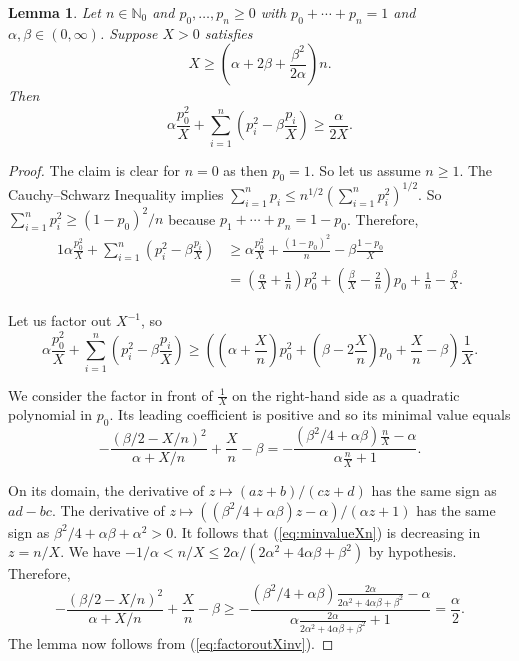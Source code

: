 \documentclass[12pt,oneside,a4]{amsart}
\newcommand{\IN}{\mathbb{N}}
\newcounter{maincounter}
\numberwithin{maincounter}{section}
\numberwithin{equation}{section}
\newtheorem{lemma}[maincounter]{Lemma}
\begin{document}
\begin{lemma}
  \label{lem:qflowerbound}
  Let $n\in\IN_0$ and $p_0,\ldots,p_n\ge 0$ with $p_0+\cdots+p_n=1$ and
  $\alpha,\beta\in (0,\infty)$. Suppose $X>0$ satisfies
  \begin{equation*}    
    X \ge \left(\alpha+2\beta+\frac{\beta^2}{2\alpha}\right)n. 
  \end{equation*}
  Then
  \begin{equation*}
    \alpha\frac{p_0^2}{X} +\sum_{i=1}^n\left(p_i^2 - \beta\frac{p_i}{X}\right)
    \ge
    \frac{\alpha}{2X}.
  \end{equation*} 
\end{lemma}
\begin{proof}
  The claim is clear for $n=0$ as then $p_0=1$. So let us assume $n\ge 1$.
  The Cauchy--Schwarz Inequality implies
  $\sum_{i=1}^n p_i \le n^{1/2} (\sum_{i=1}^n p_i^2)^{1/2}$. So
  $\sum_{i=1}^n p_i^2 \ge (1-p_0)^2/n$ because $p_1+\cdots+p_n=1-p_0$.
  Therefore,
  \begin{alignat*}1
    \alpha\frac{p_0^2}{X}  +\sum_{i=1}^n\left(p_i^2 -\beta\frac{p_i}{X}\right) &\ge 
    \alpha\frac{p_0^2}{X}  +\frac{(1-p_0)^2}{n} - \beta\frac{1-p_0}{X}\\
    &= \left(\frac{\alpha}{X} +\frac 1n\right)p_0^2 +
    \left(\frac{\beta}{X}-\frac{2}{n}\right)p_0 +\frac{1}{n} - \frac{\beta}{X}.
  \end{alignat*}

  Let us factor out $X^{-1}$, so
  \begin{equation}
    \label{eq:factoroutXinv}
    \alpha\frac{p_0^2}{X}  +\sum_{i=1}^n\left(p_i^2 -\beta\frac{p_i}{X}\right)
    \ge
    \left(\left(\alpha+\frac{X}{n}\right)p_0^2 +
      \left(\beta-2\frac{X}{n}\right)p_0 + \frac{X}{n} - \beta\right)\frac{1}{X} .
  \end{equation}

  We consider the factor in front of $\frac 1X$
  on the right-hand side
  as a quadratic polynomial in $p_0$.
  Its leading coefficient is positive and so its minimal value equals
  \begin{equation}
    \label{eq:minvalueXn}
    -\frac{(\beta/2-X/n)^2}{\alpha+X/n} + \frac Xn - \beta
    = -\frac{(\beta^2/4+\alpha\beta)\frac{n}{X}-\alpha}{\alpha\frac{n}{X}+1}.
  \end{equation}

  On its domain, the
  derivative of $z\mapsto (az+b)/(cz+d)$ has the same sign as $ad-bc$.
  The derivative of $z\mapsto ((\beta^2/4+\alpha\beta)z-\alpha)/(\alpha z+1)$
  has the same sign as $\beta^2/4+\alpha\beta+\alpha^2>0$.  It
  follows that  (\ref{eq:minvalueXn}) is decreasing in
  $z=n/X$. We have
  $-1/\alpha < n/X \le 2\alpha/(2\alpha^2 + 4\alpha\beta + \beta^2)$ by  
  hypothesis.  Therefore,
  \begin{equation*}    
    -\frac{(\beta/2-X/n)^2}{\alpha+X/n} + \frac Xn - \beta
    \ge
       -\frac{(\beta^2/4+\alpha\beta)\frac{2\alpha}{2\alpha^2+4\alpha\beta+\beta^2}-\alpha}{\alpha\frac{2\alpha}{2\alpha^2+4\alpha\beta+\beta^2}+1}
       =\frac{\alpha}{2}. 
  \end{equation*}  
  The lemma now follows from (\ref{eq:factoroutXinv}). 
\end{proof}
\end{document}

